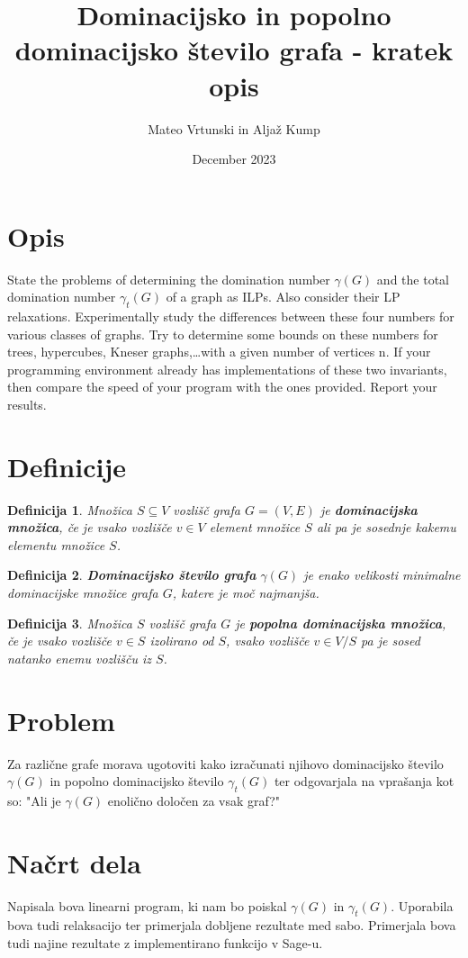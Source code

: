 \documentclass[a4paper,12pt]{article}
\newtheorem{definition}{Definicija}
\begin{document}
\author{Mateo Vrtunski in Aljaž Kump}
\date{December 2023}
\title{Dominacijsko in popolno dominacijsko število grafa - kratek opis}
\maketitle

\section{Opis}

State the problems of determining the domination number $\gamma (G)$ and the total domination number $\gamma_t (G)$ of a graph as ILPs. Also consider their LP relaxations.
Experimentally study the differences between these four numbers for various classes of graphs.
Try to determine some bounds on these numbers for trees, hypercubes, Kneser graphs,\ldots  with
a given number of vertices n. If your programming environment already has implementations of
these two invariants, then compare the speed of your program with the ones provided. Report your results.

\section{Definicije}

    \begin{definition}
       Množica $S\subseteq V$ vozlišč grafa $G = (V,E)$ je \textbf{dominacijska množica}, če je vsako vozlišče $v \in  V$ element množice $S$ ali pa je sosednje kakemu elementu množice $S$.
    \end{definition}

    \begin{definition}
        \textbf{Dominacijsko število grafa} $\gamma(G)$ je enako velikosti minimalne dominacijske množice grafa $G$, katere je moč najmanjša. 
    \end{definition}

    \begin{definition}
        Množica $S$ vozlišč grafa $G$ je \textbf{popolna dominacijska množica}, če je vsako vozlišče $v \in  S$ izolirano od $S$, vsako vozlišče $v \in V/S$ pa je sosed natanko enemu vozlišču iz $S$.
    \end{definition}
\pagebreak

\section{Problem} 
    Za različne grafe morava ugotoviti kako izračunati njihovo dominacijsko število $\gamma(G)$ in popolno dominacijsko število  $\gamma_t (G)$ ter odgovarjala na vprašanja kot so:  "Ali je $\gamma(G)$ enolično določen za vsak graf?"
    
\section{Načrt dela}
    Napisala bova linearni program, ki nam bo poiskal $\gamma(G)$ in $\gamma_t (G)$. Uporabila bova tudi relaksacijo ter primerjala dobljene rezultate med sabo. 
    Primerjala bova tudi najine rezultate z implementirano funkcijo v Sage-u.
\end{document}

